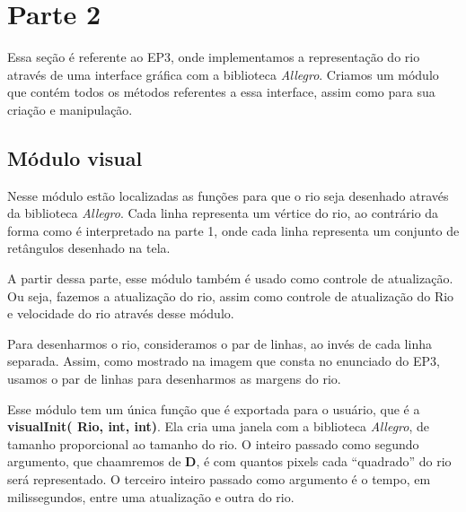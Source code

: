 \documentclass[11pt]{article}
\begin{document}
\section{Parte 2}

Essa seção é referente ao EP3, onde implementamos a representação do rio através de uma interface gráfica com a biblioteca \emph{Allegro}. Criamos um módulo que contém todos os métodos referentes a essa interface, assim como para sua criação e manipulação.

\subsection{Módulo visual}

Nesse módulo estão localizadas as funções para que o rio seja desenhado através da biblioteca \emph{Allegro}. Cada linha representa um vértice do rio, ao contrário da forma como é interpretado na parte 1, onde cada linha representa um conjunto de retângulos desenhado na tela. 

A partir dessa parte, esse módulo também é usado como controle de atualização. Ou seja, fazemos a atualização do rio, assim como controle de atualização do Rio e velocidade do rio através desse módulo.

Para desenharmos o rio, consideramos o par de linhas, ao invés de cada linha separada. Assim, como mostrado na imagem que consta no enunciado do EP3, usamos o par de linhas para desenharmos as margens do rio.

Esse módulo tem um única função que é exportada para o usuário, que é a \textbf{visualInit({\color{red} Rio},{\color{red} int},{\color{red} int})}. Ela cria uma janela com a biblioteca \emph{Allegro}, de tamanho proporcional ao tamanho do rio. O inteiro passado como segundo argumento, que chaamremos de \textbf{D}, é com quantos pixels cada ``quadrado'' do rio será representado. O terceiro inteiro passado como argumento é o tempo, em milissegundos, entre uma atualização e outra do rio.
\end{document}
